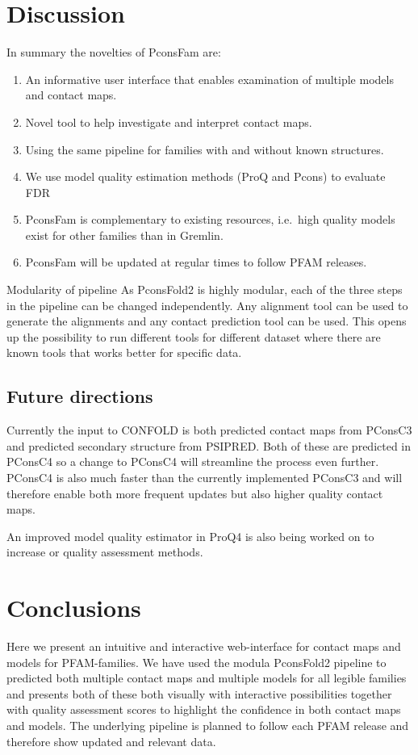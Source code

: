 \documentclass[a4,center,fleqn]{NAR}
\begin{document}
\section{Discussion}
In summary the novelties of PconsFam are:
\begin{enumerate}
\item An informative user interface that enables examination of multiple models and contact maps.
\item Novel tool to help investigate and interpret contact maps.
\item Using the same pipeline for families with and without known structures.
\item We use model quality estimation methods (ProQ and Pcons) to evaluate FDR 
\item PconsFam is complementary to existing resources, i.e.\ high quality models exist for other families than in Gremlin.
\item PconsFam will be updated at regular times to follow PFAM releases.
\end{enumerate}

Modularity of pipeline
As PconsFold2 is highly modular, each of the three steps in the pipeline
can be changed independently. Any alignment tool can be used to generate the 
alignments and any contact prediction tool can be used. This opens up
the possibility to run different tools for different dataset where
there are known tools that works better for specific data.

\subsection{Future directions}
Currently the input to CONFOLD is both predicted contact maps from PConsC3 and
predicted secondary structure from PSIPRED. Both of these are predicted in PConsC4
so a change to PConsC4 will streamline the process even further. PConsC4 is also
much faster than the currently implemented PConsC3 and will therefore enable
both more frequent updates but also higher quality contact maps.

An improved model quality estimator in ProQ4 is also being worked on to increase
or quality assessment methods.

\section{Conclusions}
Here we present an intuitive and interactive web-interface for contact maps and 
models for PFAM-families. We have used the modula PconsFold2 pipeline to predicted
both multiple contact maps and multiple models for all legible families and presents
both of these both visually with interactive possibilities together with quality 
assessment scores to highlight the confidence in both contact maps and models.
The underlying pipeline is planned to follow each PFAM release and therefore
show updated and relevant data.
\end{document}
